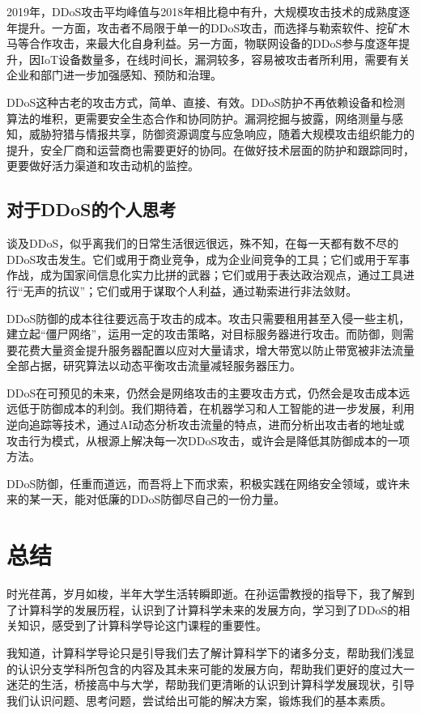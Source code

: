 \documentclass{article}
\begin{document}
2019年，DDoS攻击平均峰值与2018年相比稳中有升，大规模攻击技术的成熟度逐年提升。一方面，攻击者不局限于单一的DDoS攻击，而选择与勒索软件、挖矿木马等合作攻击，来最大化自身利益。另一方面，物联网设备的DDoS参与度逐年提升，因IoT设备数量多，在线时间长，漏洞较多，容易被攻击者所利用，需要有关企业和部门进一步加强感知、预防和治理。

DDoS这种古老的攻击方式，简单、直接、有效。DDoS防护不再依赖设备和检测算法的堆积，更需要安全生态合作和协同防护。漏洞挖掘与披露，网络测量与感知，威胁狩猎与情报共享，防御资源调度与应急响应，随着大规模攻击组织能力的提升，安全厂商和运营商也需要更好的协同。在做好技术层面的防护和跟踪同时，更要做好活力渠道和攻击动机的监控。

\subsection{对于DDoS的个人思考}

谈及DDoS，似乎离我们的日常生活很远很远，殊不知，在每一天都有数不尽的DDoS攻击发生。它们或用于商业竞争，成为企业间竞争的工具；它们或用于军事作战，成为国家间信息化实力比拼的武器；它们或用于表达政治观点，通过工具进行“无声的抗议”；它们或用于谋取个人利益，通过勒索进行非法敛财。

DDoS防御的成本往往要远高于攻击的成本。攻击只需要租用甚至入侵一些主机，建立起“僵尸网络”，运用一定的攻击策略，对目标服务器进行攻击。而防御，则需要花费大量资金提升服务器配置以应对大量请求，增大带宽以防止带宽被非法流量全部占据，研究算法以动态平衡攻击流量减轻服务器压力。

DDoS在可预见的未来，仍然会是网络攻击的主要攻击方式，仍然会是攻击成本远远低于防御成本的利剑。我们期待着，在机器学习和人工智能的进一步发展，利用逆向追踪等技术，通过AI动态分析攻击流量的特点，进而分析出攻击者的地址或攻击行为模式，从根源上解决每一次DDoS攻击，或许会是降低其防御成本的一项方法。

DDoS防御，任重而道远，而吾将上下而求索，积极实践在网络安全领域，或许未来的某一天，能对低廉的DDoS防御尽自己的一份力量。


\section{总结}

时光荏苒，岁月如梭，半年大学生活转瞬即逝。在孙运雷教授的指导下，我了解到了计算科学的发展历程，认识到了计算科学未来的发展方向，学习到了DDoS的相关知识，感受到了计算科学导论这门课程的重要性。

我知道，计算科学导论只是引导我们去了解计算科学下的诸多分支，帮助我们浅显的认识分支学科所包含的内容及其未来可能的发展方向，帮助我们更好的度过大一迷茫的生活，桥接高中与大学，帮助我们更清晰的认识到计算科学发展现状，引导我们认识问题、思考问题，尝试给出可能的解决方案，锻炼我们的基本素质。
\end{document}
